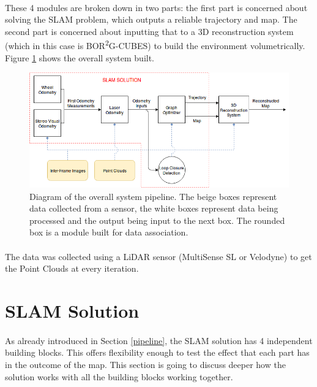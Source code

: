\documentclass[12pt]{article}
\begin{document}
	\paragraph{}
	These 4 modules are broken down in two parts: the first part is concerned about solving the SLAM problem, which outputs a reliable trajectory and map. The second part is concerned about inputting that to a 3D reconstruction system (which in this case is BOR\textsuperscript{2}G-CUBES) to build the environment volumetrically. Figure \ref{fig:SystemPipelineFigure1} shows the overall system built.
	\begin{figure}[h]
		\includegraphics[width=\linewidth]{SystemPipeline}
		\caption{Diagram of the overall system pipeline. The beige boxes represent data collected from a sensor, the white boxes represent data being processed and the output being input to the next box. The rounded box is a module built for data association.}
		\label{fig:SystemPipelineFigure1}
	\end{figure}
	
	\paragraph{}
	The data was collected using a LiDAR sensor (MultiSense SL or Velodyne) to get the Point Clouds at every iteration.
	\newpage
	\section{SLAM Solution}
	\paragraph{}
	As already introduced in Section \ref{pipeline}, the SLAM solution has 4 independent building blocks. This offers flexibility enough to test the effect that each part has in the outcome of the map. This section is going to discuss deeper how the solution works with all the building blocks working together. 
	 
\end{document}
